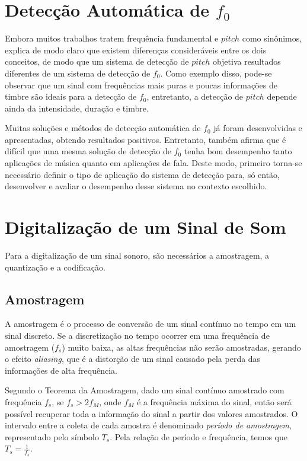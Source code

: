 \section{Detecção Automática de $f_0$}

Embora muitos trabalhos tratem frequência fundamental e $pitch$ como sinônimos, \cite{gerhard2003} explica de modo claro que existem diferenças consideráveis entre os dois conceitos, de modo que um sistema de detecção de $pitch$ objetiva resultados diferentes de um sistema de detecção de $f_0$. Como exemplo disso, pode-se observar que um sinal com frequências mais puras e poucas informações de timbre são ideais para a detecção de $f_0$, entretanto, a detecção de $pitch$ depende ainda da intensidade, duração e timbre.


Muitas soluções e métodos de detecção automática de $f_0$ já foram desenvolvidas e apresentadas, obtendo resultados positivos. Entretanto, \cite{gerhard2003} também afirma que é difícil que uma mesma solução de detecção de $f_0$ tenha bom desempenho tanto aplicações de música quanto em aplicações de fala. Deste modo, primeiro torna-se necessário definir o tipo de aplicação do sistema de detecção para, só então, desenvolver e avaliar o desempenho desse sistema no contexto escolhido.


\section{Digitalização de um Sinal de Som}

Para a digitalização de um sinal sonoro, são necessários a amostragem, a quantização e a codificação. 

\subsection{Amostragem}
A amostragem é o processo de conversão de um sinal contínuo no tempo em um sinal discreto. Se a discretização no tempo ocorrer em uma frequência de amostragem ($f_s$) muito baixa, as altas frequências não serão amostradas, gerando o efeito \textit{aliasing}, que é a distorção de um sinal causado pela perda das informações de alta frequência. 


Segundo o Teorema da Amostragem\cite{lathi2007}, dado um sinal contínuo amostrado com frequência $f_s$, se $f_s > 2f_M$, onde $f_M$ é a frequência máxima do sinal, então será possível recuperar toda a informação do sinal a partir dos valores amostrados. O intervalo entre a coleta de cada amostra é denominado \textit{período de amostragem}, representado pelo símbolo $T_s$. Pela relação de período e frequência, temos que $T_s = \frac{1}{f_s}$.


